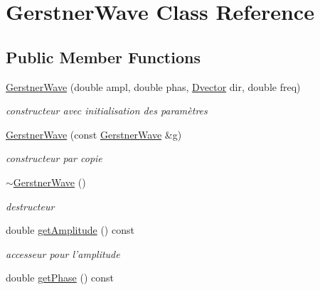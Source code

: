 \hypertarget{classGerstnerWave}{\section{Gerstner\-Wave Class Reference}
\label{classGerstnerWave}
}
\subsection*{Public Member Functions}
\begin{DoxyCompactItemize}
\item 
\hyperlink{classGerstnerWave_a0045d1db79193644ca35bee5792a1b27}{Gerstner\-Wave} (double ampl, double phas, \hyperlink{classDvector}{Dvector} dir, double freq)
\begin{DoxyCompactList}\small\item\em constructeur avec initialisation des paramètres \end{DoxyCompactList}\item 
\hyperlink{classGerstnerWave_a14bf3cb2ed7f00cb86317beed8a1b79a}{Gerstner\-Wave} (const \hyperlink{classGerstnerWave}{Gerstner\-Wave} \&g)
\begin{DoxyCompactList}\small\item\em constructeur par copie \end{DoxyCompactList}\item 
\hypertarget{classGerstnerWave_af3df02ad2ba5fa164c83e332eabadfea}{\hyperlink{classGerstnerWave_af3df02ad2ba5fa164c83e332eabadfea}{$\sim$\-Gerstner\-Wave} ()}\label{classGerstnerWave_af3df02ad2ba5fa164c83e332eabadfea}

\begin{DoxyCompactList}\small\item\em destructeur \end{DoxyCompactList}\item 
\hypertarget{classGerstnerWave_af7652183f345e8fa3830230765fd66dc}{double \hyperlink{classGerstnerWave_af7652183f345e8fa3830230765fd66dc}{get\-Amplitude} () const }\label{classGerstnerWave_af7652183f345e8fa3830230765fd66dc}

\begin{DoxyCompactList}\small\item\em accesseur pour l'amplitude \end{DoxyCompactList}\item 
\hypertarget{classGerstnerWave_a6e7d08e560ccc9713cb0f195779ddbf5}{double \hyperlink{classGerstnerWave_a6e7d08e560ccc9713cb0f195779ddbf5}{get\-Phase} () const }\label{classGerstnerWave_a6e7d08e560ccc9713cb0f195779ddbf5}


\end{DoxyCompactItemize}
